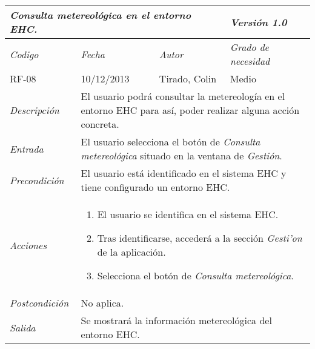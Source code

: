 \begin{tabular}{|p{3cm}|p{3cm}|p{3cm}|p{3cm}|}
\hline \multicolumn{3}{|p{9cm}|}{\textit{Consulta metereol\'ogica en el entorno EHC.}} & \textit{Versi\'on 1.0} \\
\hline \textit{Codigo} & \textit{Fecha} & \textit{Autor} & \textit{Grado de necesidad} \\
RF-08 & 10/12/2013 & Tirado, Colin & Medio \\
\hline \textit{Descripci\'on} & \multicolumn{3}{|p{9cm}|}{El usuario podr\'a consultar la metereolog\'ia en el entorno EHC para as\'i, poder realizar alguna acci\'on concreta.} \\
\hline \textit{Entrada} & \multicolumn{3}{|p{9cm}|}{El usuario selecciona el bot\'on de \textit{Consulta metereol\'ogica} situado en la ventana de \textit{Gesti\'on}.} \\
\hline \textit{Precondici\'on} & \multicolumn{3}{|p{9cm}|}{El usuario est\'a identificado en el sistema EHC y tiene configurado un entorno EHC.} \\
\hline \textit{Acciones} & \multicolumn{3}{|p{9cm}|}{
\begin{enumerate}
\item El usuario se identifica en el sistema EHC.
\item Tras identificarse, acceder\'a a la secci\'on \textit{Gesti'on} de la aplicaci\'on.
\item Selecciona el bot\'on de \textit{Consulta metereol\'ogica}.
\end{enumerate}
} \\
\hline \textit{Postcondici\'on} & \multicolumn{3}{|p{9cm}|}{No aplica.} \\
\hline \textit{Salida} & \multicolumn{3}{|p{9cm}|}{Se mostrar\'a la informaci\'on metereol\'ogica del entorno EHC.} \\ \hline
\end{tabular}